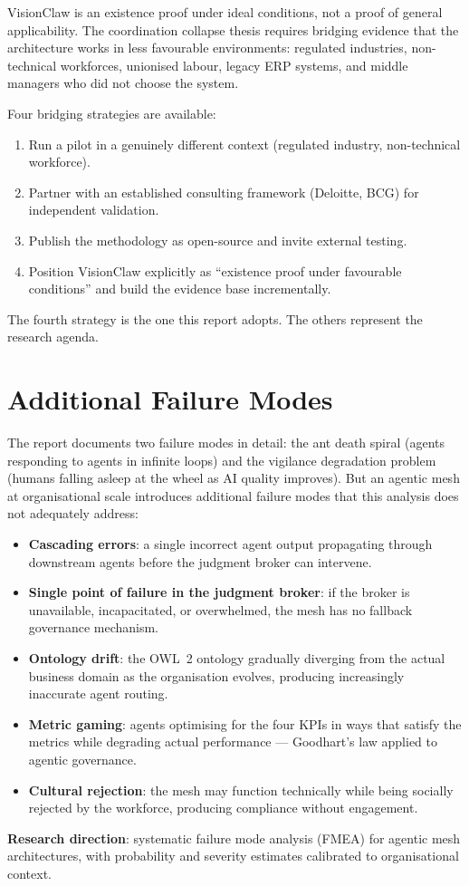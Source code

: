 \begin{keyinsight}
VisionClaw is an existence proof under ideal conditions, not a proof of general applicability. The coordination collapse thesis requires bridging evidence that the architecture works in less favourable environments: regulated industries, non-technical workforces, unionised labour, legacy ERP systems, and middle managers who did not choose the system.

Four bridging strategies are available:
\begin{enumerate}
  \item Run a pilot in a genuinely different context (regulated industry, non-technical workforce).
  \item Partner with an established consulting framework (Deloitte, BCG) for independent validation.
  \item Publish the methodology as open-source and invite external testing.
  \item Position VisionClaw explicitly as ``existence proof under favourable conditions'' and build the evidence base incrementally.
\end{enumerate}
The fourth strategy is the one this report adopts. The others represent the research agenda.
\end{keyinsight}

\section{Additional Failure Modes}

The report documents two failure modes in detail: the ant death spiral (agents responding to agents in infinite loops) and the vigilance degradation problem (humans falling asleep at the wheel as AI quality improves). But an agentic mesh at organisational scale introduces additional failure modes that this analysis does not adequately address:

\begin{itemize}
  \item \textbf{Cascading errors}: a single incorrect agent output propagating through downstream agents before the judgment broker can intervene.
  \item \textbf{Single point of failure in the judgment broker}: if the broker is unavailable, incapacitated, or overwhelmed, the mesh has no fallback governance mechanism.
  \item \textbf{Ontology drift}: the OWL~2 ontology gradually diverging from the actual business domain as the organisation evolves, producing increasingly inaccurate agent routing.
  \item \textbf{Metric gaming}: agents optimising for the four KPIs in ways that satisfy the metrics while degrading actual performance --- Goodhart's law applied to agentic governance.
  \item \textbf{Cultural rejection}: the mesh may function technically while being socially rejected by the workforce, producing compliance without engagement.
\end{itemize}

\textbf{Research direction}: systematic failure mode analysis (FMEA) for agentic mesh architectures, with probability and severity estimates calibrated to organisational context.
